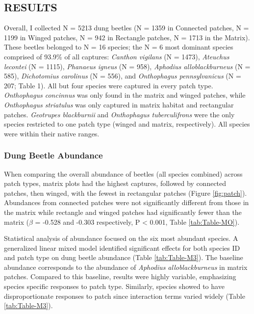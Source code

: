 \documentclass[
  man, donotrepeattitle]{apa6}
\begin{document}
\subsection{RESULTS}\label{results}

Overall, I collected N = 5213 dung beetles (N = 1359 in Connected patches, N = 1199 in Winged patches, N = 942 in Rectangle patches, N = 1713 in the Matrix). These beetles belonged to N = 16 species; the N = 6 most dominant species comprised of 93.9\% of all captures: \textit{Canthon vigilans} (N = 1473), \textit{Ateuchus lecontei} (N = 1115), \textit{Phanaeus igneus} (N = 958), \textit{Aphodius alloblackburneus} (N = 585), \textit{Dichotomius carolinus} (N = 556), and \textit{Onthophagus pennsylvanicus} (N = 207; Table 1). All but four species were captured in every patch type. \emph{Onthophagus concinnus} was only found in the matrix and winged patches, while \emph{Onthophagus striatulus} was only captured in matrix habitat and rectangular patches. \emph{Geotrupes blackburnii} and \emph{Onthophagus tuberculifrons} were the only species restricted to one patch type (winged and matrix, respectively). All species were within their native ranges.

\subsubsection{Dung Beetle Abundance}\label{dung-beetle-abundance}

When comparing the overall abundance of beetles (all species combined) across patch types, matrix plots had the highest captures, followed by connected patches, then winged, with the fewest in rectangular patches (Figure \ref{fig:patch}). Abundances from connected patches were not significantly different from those in the matrix while rectangle and winged patches had significantly fewer than the matrix (\(\beta\) = -0.528 and -0.303 respectively, P \textless{} 0.001, Table \ref{tab:Table-MO}).

Statistical analysis of abundance focused on the six most abundant species. A generalized linear mixed model identified significant effects for both species ID and patch type on dung beetle abundance (Table \ref{tab:Table-M3}). The baseline abundance corresponds to the abundance of \emph{Aphodius alloblackburneus} in matrix patches. Compared to this baseline, results were highly variable, emphasizing species specific responses to patch type. Similarly, species showed to have disproportionate responses to patch since interaction terms varied widely (Table \ref{tab:Table-M3}).
\end{document}
